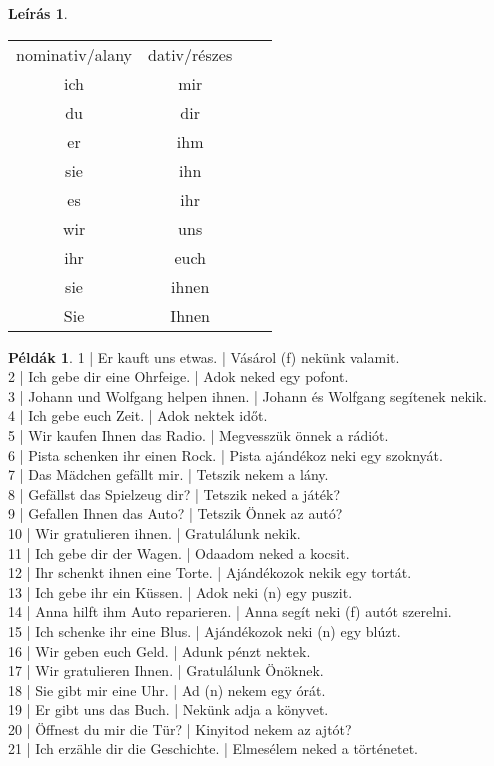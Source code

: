 \documentclass{article}
\theoremstyle{definition}
\newtheorem*{exmp}{Példák}
\newtheorem*{desc}{Leírás}
\begin{document}
\begin{desc}
\begin{tabular}{cccc}
 nominativ/alany & dativ/részes \\
 ich & mir \\
 du & dir \\
 er & ihm \\
 sie & ihn \\
 es & ihr \\
 wir & uns \\
 ihr & euch \\
 sie & ihnen \\
 Sie & Ihnen \\
\end{tabular}
\end{desc}

\begin{exmp}	%
1 | Er kauft uns etwas. | Vásárol (f) nekünk valamit.\\
2 | Ich gebe dir eine Ohrfeige. | Adok neked egy pofont.\\
3 | Johann und Wolfgang helpen ihnen. | Johann és Wolfgang segítenek nekik.\\
4 | Ich gebe euch Zeit. | Adok nektek időt.\\
5 | Wir kaufen Ihnen das Radio. | Megvesszük önnek a rádiót.\\
6 | Pista schenken ihr einen Rock. | Pista ajándékoz neki egy szoknyát.\\
7 | Das Mädchen gefällt mir. | Tetszik nekem a lány.\\
8 | Gefällst das Spielzeug dir? | Tetszik neked a játék?\\
9 | Gefallen Ihnen das Auto? | Tetszik Önnek az autó?\\
10 | Wir gratulieren ihnen. | Gratulálunk nekik.\\
11 | Ich gebe dir der Wagen. | Odaadom neked a kocsit.\\
12 | Ihr schenkt ihnen eine Torte. | Ajándékozok nekik egy tortát.\\
13 | Ich gebe ihr ein Küssen. | Adok neki (n) egy puszit.\\
14 | Anna hilft ihm Auto reparieren. | Anna segít neki (f) autót szerelni.\\
15 | Ich schenke ihr eine Blus. | Ajándékozok neki (n) egy blúzt.\\
16 | Wir geben euch Geld. | Adunk pénzt nektek.\\
17 | Wir gratulieren Ihnen. | Gratulálunk Önöknek.\\
18 | Sie gibt mir eine Uhr. | Ad (n) nekem egy órát.\\
19 | Er gibt uns das Buch. | Nekünk adja a könyvet.\\
20 | Öffnest du mir die Tür? | Kinyitod nekem az ajtót?\\
21 | Ich erzähle dir die Geschichte. | Elmesélem neked a történetet.\\
\end{exmp}
\end{document}
